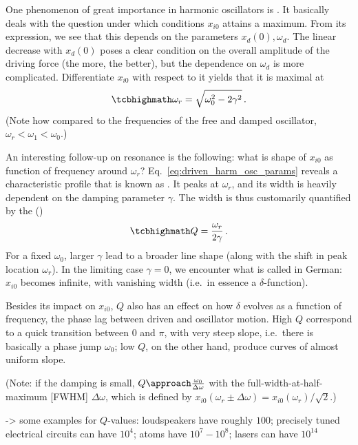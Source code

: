 \documentclass[../class_mech_main.tex]{subfiles}
\begin{document}
One phenomenon of great importance in harmonic oscillators is . It basically deals with the question under which conditions $x_{i0}$ attains a maximum. From its expression, we see that this depends on the parameters $x_d(0), \omega_d$. The linear decrease with $x_d(0)$ poses a clear condition on the overall amplitude of the driving force (the more, the better), but the dependence on $\omega_d$ is more complicated. Differentiate $x_{i0}$ with respect to it yields that it is maximal at
\begin{equation}
	\eqbox{
		\omega_r = \sqrt{\omega_0^2 - 2 \gamma^2}
	} \, .
\end{equation}
(Note how compared to the frequencies of the free and damped oscillator, $\omega_r < \omega_1 < \omega_0$.)

An interesting follow-up on resonance is the following: what is shape of $x_{i0}$ as function of frequency around $\omega_r$? Eq.~\eqref{eq:driven_harm_osc_params} reveals a characteristic profile that is known as . It peaks at $\omega_r$, and its width is heavily dependent on the damping parameter $\gamma$. The width is thus customarily quantified by the  ()
\begin{equation}
	\eqbox{
		Q = \frac{\omega_r}{2\gamma}
	} \, .
\end{equation}
For a fixed $\omega_0$, larger $\gamma$ lead to a broader line shape (along with the shift in peak location $\omega_r$). In the limiting case $\gamma = 0$, we encounter what is called  in German: $x_{i0}$ becomes infinite, with vanishing width (i.e.~in essence a $\delta$-function).

Besides its impact on $x_{i0}$, $Q$ also has an effect on how $\delta$ evolves as a function of frequency, the phase lag between driven and oscillator motion. High $Q$ correspond to a quick transition between $0$ and $\pi$, with very steep slope, i.e.~there is basically a phase jump $\omega_0$; low $Q$, on the other hand, produce curves of almost uniform slope.

(Note: if the damping is small, $Q \approach \frac{\omega_0}{\Delta \omega}$ with the full-width-at-half-maximum [FWHM] $\Delta \omega$, which is defined by $x_{i0}(\omega_r \pm \Delta \omega) = x_{i0}(\omega_r)/\sqrt{2}$.)

-> some examples for $Q$-values: loudspeakers have roughly $100$; precisely tuned electrical circuits can have $10^4$; atoms have $10^7 - 10^8$; lasers can have $10^{14}$
\end{document}
